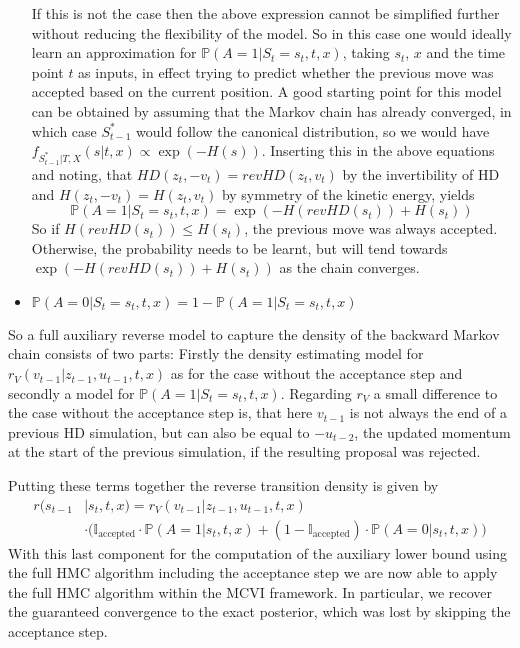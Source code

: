 \documentclass[12pt]{scrartcl}
\begin{document}
\begin{itemize}
If this is not the case then the above expression cannot be simplified further without reducing the flexibility of the model. So in this case one would ideally learn an approximation for $\mathbb{P}(A=1|S_t = s_t, t, x)$, taking $s_t$, $x$ and the time point $t$ as inputs, in effect trying to predict whether the previous move was accepted based on the current position. A good starting point for this model can be obtained by assuming that the Markov chain has already converged, in which case $S_{t-1}^*$ would follow the canonical distribution, so we would have $f_{S^*_{t-1}|T, X}(s| t, x) \propto \exp(-H(s))$. Inserting this in the above equations and noting, that $HD(z_t, -v_t) = revHD(z_t, v_t)$ by the invertibility of HD and $H(z_t, -v_t) = H(z_t, v_t)$ by symmetry of the kinetic energy, yields
\begin{equation}
\mathbb{P}(A = 1|S_t = s_t, t, x) = \exp(-H(revHD(s_t)) + H(s_t))
\end{equation}
So if $H(revHD(s_t)) \leq H(s_t)$, the previous move was always accepted. Otherwise, the probability needs to be learnt, but will tend towards $\exp(-H(revHD(s_t)) + H(s_t))$ as the chain converges. 
\item $\mathbb{P}(A = 0|S_t = s_t, t, x) = 1 - \mathbb{P}(A = 1|S_t = s_t, t, x)$
\end{itemize}

So a full auxiliary reverse model to capture the density of the backward Markov chain consists of two parts: Firstly the density estimating model for $r_V(v_{t-1}|z_{t-1}, u_{t-1}, t, x)$ as for the case without the acceptance step and secondly a model for $\mathbb{P}(A = 1|S_t = s_t, t, x)$. Regarding $r_V$ a small difference to the case without the acceptance step is, that here $v_{t-1}$ is not always the end of a previous HD simulation, but can also be equal to  $-u_{t-2}$, the updated momentum at the start of the previous simulation, if the resulting proposal was rejected. 

Putting these terms together the reverse transition density is given by
\begin{equation}
\begin{split}
r(s_{t-1} &| s_t, t, x) = r_V(v_{t-1}| z_{t-1}, u_{t-1}, t, x) \\
&\cdot \Big( \mathbb{I}_\textrm{accepted} \cdot \mathbb{P}(A = 1 | s_{t}, t, x) + (1 - \mathbb{I}_\textrm{accepted}) \cdot \mathbb{P}(A = 0 | s_{t}, t, x) \Big)
\end{split}
\end{equation}
With this last component for the computation of the auxiliary lower bound using the full HMC algorithm including the acceptance step we are now able to apply the full HMC algorithm within the MCVI framework. In particular, we recover the guaranteed convergence to the exact posterior, which was lost by skipping the acceptance step.
\end{document}
